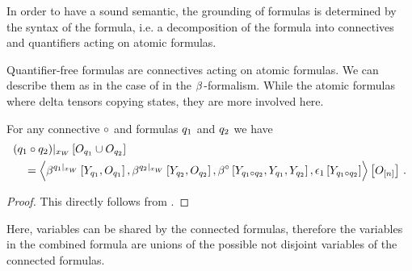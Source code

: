 
\label{sec:folConnectiveRepresentation}

In order to have a sound semantic, the grounding of \firstOrderLogic{} formulas is determined by the syntax of the formula, i.e. a decomposition of the formula into connectives and quantifiers acting on atomic formulas.

Quantifier-free formulas are connectives acting on atomic formulas.
We can describe them as in the case of \propositionalLogic{} in the $\beta^{}$-formalism.
While the atomic formulas where delta tensors copying states, they are more involved here.

\begin{theorem}
    For any connective $\circ$ and formulas $q_1$ and $q_2$ we have
    \begin{align}
        &{(q_1\circ q_2)}|_{x_{W}} \left[O_{q_1}\cup O_{q_2}\right] \\
        &\quad=
        \left\langle 
            \beta^{{q_1}|_{x_{W}}}\left[Y_{q_1},O_{q_1}\right],
            \beta^{{q_2}|_{x_{W}}}\left[Y_{q_2},O_{q_2}\right],
            \beta^{\circ}\left[Y_{q_1\circ q_2}, Y_{q_1}, Y_{q_2}\right],
            \epsilon_1\left[Y_{q_1\circ q_2}\right]
        \right\rangle \left[ O_{[n]} \right] \, .
    \end{align}
\end{theorem}
\begin{proof}
    This directly follows from .
\end{proof}

Here, variables can be shared by the connected formulas, therefore the variables in the combined formula are unions of the possible not disjoint variables of the connected formulas.


